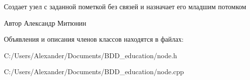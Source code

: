 Создает узел с заданной пометкой без связей и назначает его младшим потомком 

\begin{DoxyAuthor}{Автор}
Александр Митюнин 
\end{DoxyAuthor}


Объявления и описания членов классов находятся в файлах\+:\begin{DoxyCompactItemize}
\item 
C\+:/\+Users/\+Alexander/\+Documents/\+B\+D\+D\+\_\+education/node.\+h\item 
C\+:/\+Users/\+Alexander/\+Documents/\+B\+D\+D\+\_\+education/node.\+cpp\end{DoxyCompactItemize}
